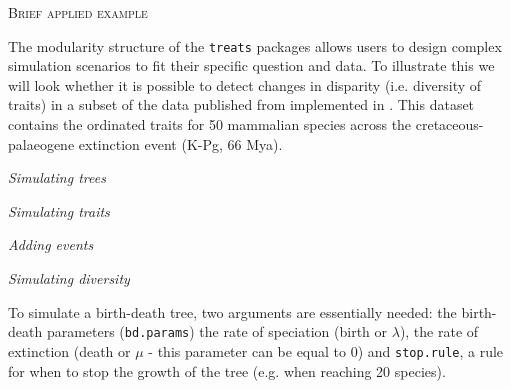 \documentclass[12pt,letterpaper]{article}
\renewcommand{\section}[1]{%
\bigskip
\begin{center}
\begin{Large}
\normalfont\scshape #1
\medskip
\end{Large}
\end{center}}
\renewcommand{\subsection}[1]{%
\bigskip
\begin{center}
\begin{large}
\normalfont\itshape #1
\end{large}
\end{center}}
\newcommand{\treats}{\texttt{treats} }
\begin{document}
\section{Brief applied example}

The modularity structure of the \treats packages allows users to design complex simulation scenarios to fit their specific question and data.
To illustrate this we will look whether it is possible to detect changes in disparity (i.e. diversity of traits) in a subset of the data published from \cite{beck2014ancient} implemented in \cite{dispRity}.
This dataset contains the ordinated traits for 50 mammalian species across the cretaceous-palaeogene extinction event (K-Pg, 66 Mya).


\subsection{Simulating trees}


\subsection{Simulating traits}


\subsection{Adding events}




\subsection{Simulating diversity}

To simulate a birth-death tree, two arguments are essentially needed: the birth-death parameters (\texttt{bd.params}) the rate of speciation (birth or $\lambda$), the rate of extinction (death or $\mu$ - this parameter can be equal to 0) and \texttt{stop.rule}, a rule for when to stop the growth of the tree (e.g. when reaching 20 species).


\end{document}
